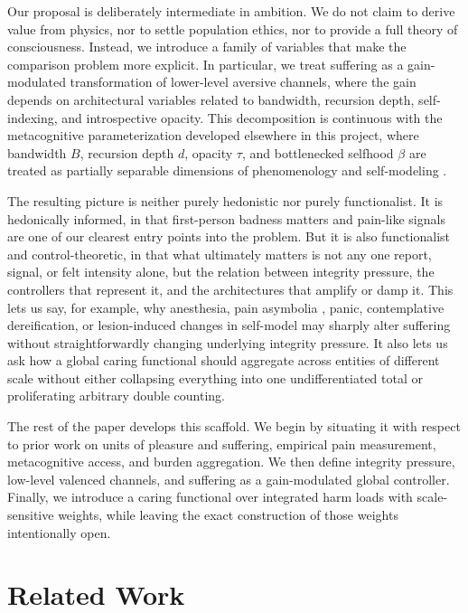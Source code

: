 \documentclass[11pt]{article}
\begin{document}
Our proposal is deliberately intermediate in ambition. We do not claim to derive value from physics, nor to settle population ethics, nor to provide a full theory of consciousness. Instead, we introduce a family of variables that make the comparison problem more explicit. In particular, we treat suffering as a gain-modulated transformation of lower-level aversive channels, where the gain depends on architectural variables related to bandwidth, recursion depth, self-indexing, and introspective opacity. This decomposition is continuous with the metacognitive parameterization developed elsewhere in this project, where bandwidth $B$, recursion depth $d$, opacity $\tau$, and bottlenecked selfhood $\beta$ are treated as partially separable dimensions of phenomenology and self-modeling \cite{zarncke2026rainbow}.

The resulting picture is neither purely hedonistic nor purely functionalist. It is hedonically informed, in that first-person badness matters and pain-like signals are one of our clearest entry points into the problem. But it is also functionalist and control-theoretic, in that what ultimately matters is not any one report, signal, or felt intensity alone, but the relation between integrity pressure, the controllers that represent it, and the architectures that amplify or damp it. This lets us say, for example, why anesthesia, pain asymbolia \cite{gerrans2024pain}, panic, contemplative dereification, or lesion-induced changes in self-model may sharply alter suffering without straightforwardly changing underlying integrity pressure. It also lets us ask how a global caring functional should aggregate across entities of different scale without either collapsing everything into one undifferentiated total or proliferating arbitrary double counting.

The rest of the paper develops this scaffold. We begin by situating it with respect to prior work on units of pleasure and suffering, empirical pain measurement, metacognitive access, and burden aggregation. We then define integrity pressure, low-level valenced channels, and suffering as a gain-modulated global controller. Finally, we introduce a caring functional over integrated harm loads with scale-sensitive weights, while leaving the exact construction of those weights intentionally open.

\section{Related Work}
\end{document}
